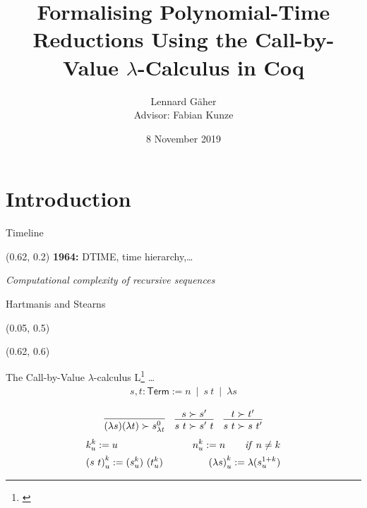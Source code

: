 \documentclass[11pt,usenames,dvipsnames,
  hyperref={pdfencoding=auto,psdextra}]{beamer}
\title{Formalising Polynomial-Time Reductions Using the Call-by-Value $\lambda$-Calculus in Coq}
\institute{Saarland University}
\date{8 November 2019}
\author{Lennard Gäher\\[1mm] {\small{Advisor: Fabian Kunze}}}
\let\otp\titlepage
\renewcommand{\titlepage}{\otp\addtocounter{framenumber}{-1}}
\newcommand{\bnfmid}{~\mid~}
\begin{document}
\begin{frame}[plain]
  \titlepage
\end{frame}

\section{Introduction}
\begin{frame}{Timeline}

  \setlength{\TPHorizModule}{\textwidth}
  \setlength{\TPVertModule}{\textwidth}
  \begin{textblock}{0.5} (0.62, 0.2)
    \small
    \textbf{1964:} DTIME, time hierarchy,\ldots

    \emph{Computational complexity of recursive sequences}

    Hartmanis and Stearns
  \end{textblock}

    \begin{textblock}{0.5} (0.05, 0.5)
    \end{textblock}

    \begin{textblock}{0.5} (0.62, 0.6)
    \end{textblock}
\end{frame}

\newcommand{\Term}{\textsf{Term}}

\begin{frame}{The Call-by-Value $\lambda$-calculus L\footnote{\cite{ForsterSmolka:2017:L-Computability}} \ldots}
  \begin{align*}
    s, t : \Term := n \bnfmid s~t \bnfmid \lambda s
  \end{align*}

  \begin{align*}
    \infer{(\lambda s)(\lambda t) \succ s^0_{\lambda t}}{}
    && 
    \infer{s~t \succ s'~t}{s \succ s'}
    && 
    \infer{s~t \succ s~t'}{t \succ t'}
  \end{align*}
  \begin{alignat*}{2}
    &k^k_u := u \qquad& n^k_u := n \qquad \mathit{if}~n\neq k \\
    & {(s~t)}^k_u := (s^k_u)~(t^k_u) 
    \qquad & {(\lambda s)}^k_u := \lambda(s^{\natS k}_u)
  \end{alignat*}
\end{frame}
\end{document}
